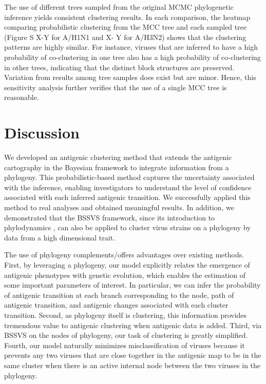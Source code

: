\documentclass[11pt,oneside,letterpaper]{article}
\begin{document}
The use of different trees sampled from the original MCMC phylogenetic inference yields consistent clustering results. 
In each comparison, the heatmap comparing probabilistic clustering from the MCC tree and each sampled tree (Figure S X-Y  for A/H1N1 and X- Y for A/H3N2) shows that the clustering patterns are highly similar. 
For instance, viruses that are inferred to have a high probability of co-clustering in one tree also has a high probability of co-clustering in other trees, indicating that the distinct block structures are preserved. 
Variation from results among tree samples does exist but are minor. 
Hence, this sensitivity analysis further verifies that the use of a single MCC tree is reasonable.




\newpage

\section*{Discussion}

We developed an antigenic clustering method that extends the antigenic cartography in the Bayesian framework to integrate information from a phylogeny. 
This probabilistic-based method captures the uncertainty associated with the inference, enabling investigators to understand the level of confidence associated with each inferred antigenic transition. 
We successfully applied this method to real analyses and obtained meaningful results.
In addition, we demonstrated that the BSSVS framework, since its introduction to phylodynamics \cite{lemey_bayesian_2009, drummond_bayesian_2010}, can also be applied to cluster virus strains on a phylogeny by data from a high dimensional trait.  

The use of phylogeny complements/offers advantages over existing methods. 
First, by leveraging a phylogeny, our model explicitly relates the emergence of antigenic phenotypes with genetic evolution, which enables the estimation of some important parameters of interest. 
In particular, we can infer the probability of antigenic transition at each branch corresponding to the node, path of antigenic transition, and antigenic changes associated with each cluster transition. 
Second, as phylogeny itself is clustering, this information provides tremendous value to antigenic clustering when antigenic data is added. 
Third, via BSSVS on the nodes of phylogeny, our task of clustering is greatly simplified. 
Fourth, our model naturally minimizes misclassification of viruses because it prevents any two viruses that are close together in the antigenic map to be in the same cluster when there is an active internal node between the two viruses in the phylogeny.
\end{document}
